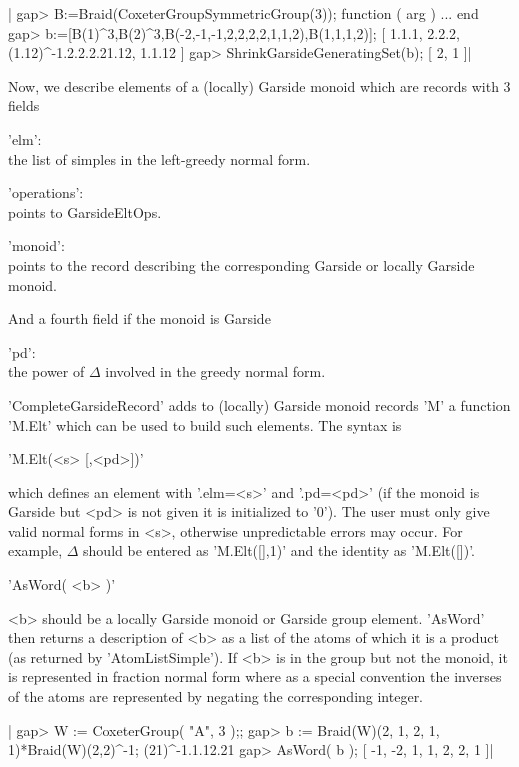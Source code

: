 |    gap> B:=Braid(CoxeterGroupSymmetricGroup(3));
    function ( arg ) ... end
    gap> b:=[B(1)^3,B(2)^3,B(-2,-1,-1,2,2,2,2,1,1,2),B(1,1,1,2)];
    [ 1.1.1, 2.2.2, (1.12)^-1.2.2.2.21.12, 1.1.12 ]
    gap>  ShrinkGarsideGeneratingSet(b);
    [ 2, 1 ]|


Now,  we describe elements of a  (locally) Garside monoid which are records
with 3 fields\:

'elm':\\ the list of simples in the left-greedy normal form.

'operations':\\ points to GarsideEltOps.

'monoid':\\  points to the  record describing the  corresponding Garside or
locally Garside monoid.

And a fourth field if the monoid is Garside\:

'pd':\\ the power of $\Delta$ involved in the greedy normal form.

'CompleteGarsideRecord'  adds  to  (locally)  Garside  monoid records 'M' a
function 'M.Elt' which can be used to build such elements. The syntax is

'M.Elt(<s> [,<pd>])'

which  defines an element with '.elm=<s>'  and '.pd=<pd>' (if the monoid is
Garside but <pd> is not given it is initialized to '0'). The user must only
give  valid normal forms in <s>,  otherwise unpredictable errors may occur.
For  example, $\Delta$ should be entered  as 'M.Elt([],1)' and the identity
as 'M.Elt([])'.


'AsWord( <b> )'

<b>  should be a locally Garside  monoid or Garside group element. 'AsWord'
then  returns a description of <b> as a list  of the atoms of which it is a
product  (as returned by 'AtomListSimple'). If <b>  is in the group but not
the  monoid, it is represented  in fraction normal form  where as a special
convention  the  inverses  of  the  atoms  are  represented by negating the
corresponding integer.

|    gap>  W := CoxeterGroup( "A", 3 );;
    gap>  b := Braid(W)(2, 1, 2, 1, 1)*Braid(W)(2,2)^-1;
    (21)^-1.1.12.21
    gap> AsWord( b );
    [ -1, -2, 1, 1, 2, 2, 1 ]|

